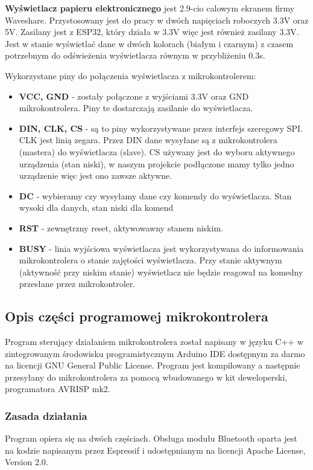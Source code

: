 \documentclass[a4paper,12pt, twoside]{article}
\begin{document}
	\vspace{1cm}

    \textbf{Wyświetlacz papieru elektronicznego} jest 2.9-cio calowym ekranem firmy Waveshare. Przystosowany jest do pracy w dwóch napięciach roboczych 3.3V oraz 5V. Zasilany jest z ESP32, który działa w 3.3V więc jest również zasilany 3.3V. Jest w stanie wyświetlać dane w dwóch kolorach (białym i czarnym) z czasem potrzebnym do odświeżenia wyświetlacza równym w przybliżeniu 0.3s\cite{waveshare}.
    
    Wykorzystane piny do połączenia wyświetlacza z mikrokontrolerem: 
    \begin{itemize}
        \item \textbf{VCC, GND} - zostały połączone z wyjściami 3.3V oraz GND mikrokontrolera. Piny te dostarczają zasilanie do wyświetlacza.
        \item \textbf{DIN, CLK, CS} - są to piny wykorzystywane przez interfejs szeregowy SPI. CLK jest linią zegara. Przez DIN dane wysyłane są z mikrokontrolera (mastera) do wyświetlacza (slave). CS używany jest do wyboru aktywnego urządzenia (stan niski), w naszym projekcie podłączone mamy tylko jedno urządzenie więc jest ono zawsze aktywne.
        \item \textbf{DC} - wybieramy czy wysyłamy dane czy komendy do wyświetlacza. Stan wysoki dla danych, stan niski dla komend
        \item \textbf{RST} - zewnętrzny reset, aktywowawny stanem niskim.
        \item \textbf{BUSY}  - linia wyjściowa wyświetlacza jest wykorzystywana do informowania mikrokontrolera o stanie zajętości wyświetlacza. Przy stanie aktywnym (aktywność przy niskim stanie) wyświetlacz nie będzie reagował na komedny przesłane przez mikrokontroler. 
    \end{itemize}
    
    \vspace{.5cm}
    \subsection{Opis części programowej mikrokontrolera}
	Program sterujący działaniem mikrokontrolera został napisany w języku C++ w zintegrowanym środowisku programistycznym Arduino IDE dostępnym za darmo na licencji GNU General Public License. Program jest kompilowany a następnie przesyłany do mikrokontrolera za pomocą wbudowanego w kit deweloperski, programatora AVRISP mk2.
	\vspace{.5cm}
	\subsubsection{Zasada działania}
	\vspace{.5cm}
    Program opiera się na dwóch częściach. Obsługa modułu Bluetooth oparta jest na kodzie napisanym przez Espressif i udostępnianym na licencji Apache License, Version 2.0. 
    
\end{document}

